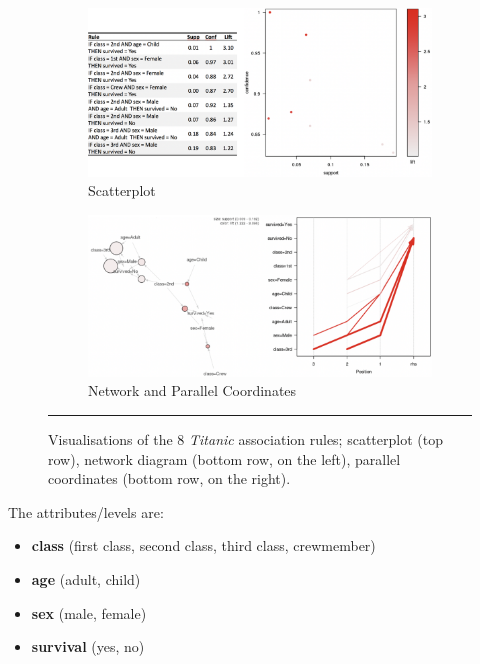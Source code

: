 \newpage\noindent \begin{figure}[!t]
\centering
\begin{subfigure}[b]{0.7\textwidth}
\includegraphics[width=\textwidth]{images/DSML/titanic1.png}\caption{\small Scatterplot} \label{fig:titanic1}
\end{subfigure}\qquad
\begin{subfigure}[b]{0.7\textwidth}
\includegraphics[width=\textwidth]{images/DSML/titanic2.png}\caption{\small Network and Parallel Coordinates} \label{fig:titanic2}
\end{subfigure}
\caption[\small Visualisations of the \textit{Titanic} association rules]{\small Visualisations of the 8 \textit{Titanic} association rules; scatterplot (top row), network diagram (bottom row, on the left), parallel coordinates (bottom row, on the right).}\label{fig:titanic}\hrule
\end{figure}\afterpage{\FloatBarrier}
The attributes/levels are:
\begin{itemize}[noitemsep]
\item \textbf{class} (first class, second class, third class, crewmember)
\item \textbf{age} (adult, child)
\item \textbf{sex} (male, female)
\item \textbf{survival} (yes, no)
\end{itemize}
